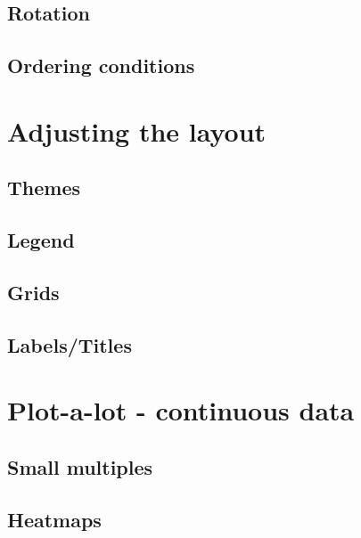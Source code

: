 \documentclass[
]{book}
\begin{document}
\hypertarget{rotation}{%
\subsection{Rotation}\label{rotation}}

\hypertarget{ordering-conditions}{%
\subsection{Ordering conditions}\label{ordering-conditions}}

\hypertarget{adjusting-the-layout}{%
\section{Adjusting the layout}\label{adjusting-the-layout}}

\hypertarget{themes}{%
\subsection{Themes}\label{themes}}

\hypertarget{legend}{%
\subsection{Legend}\label{legend}}

\hypertarget{grids}{%
\subsection{Grids}\label{grids}}

\hypertarget{labelstitles}{%
\subsection{Labels/Titles}\label{labelstitles}}

\hypertarget{plot-a-lot---continuous-data}{%
\section{Plot-a-lot - continuous data}\label{plot-a-lot---continuous-data}}

\hypertarget{small-multiples}{%
\subsection{Small multiples}\label{small-multiples}}

\hypertarget{heatmaps}{%
\subsection{Heatmaps}\label{heatmaps}}
\end{document}
